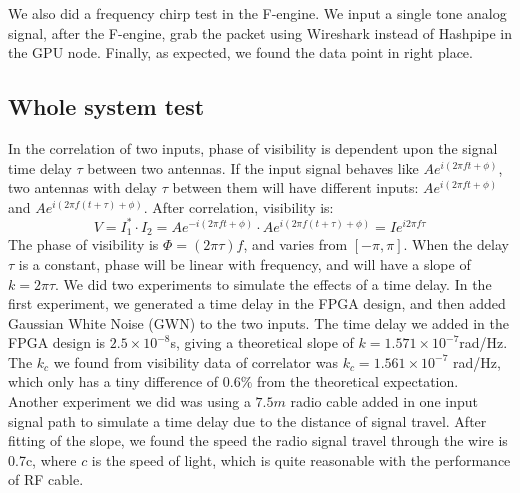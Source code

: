\documentclass{ws-jai}
\begin{document}
We also did a frequency chirp test in the F-engine. We input a single tone analog signal,  after the F-engine, grab the packet using  Wireshark instead of Hashpipe in the GPU node.
Finally, as expected, we found the data point in right place.


\subsection{Whole system test}
In the correlation of two inputs, phase of visibility is dependent upon the signal time delay $\tau$ between two antennas. If the input signal behaves like $Ae^{i(2\pi ft + \phi)}$, two antennas with delay $\tau$ between them will have different inputs: $Ae^{i(2\pi ft + \phi)}$ and  $Ae^{i(2\pi f(t+\tau) + \phi)}$.
After correlation, visibility is:
\begin{equation}
V = I_1^*\cdot I_2=Ae^{-i(2\pi ft + \phi)} \cdot Ae^{i(2\pi f(t+\tau) + \phi)} = I e^{i2\pi f\tau}
\end{equation}
The phase of visibility is $\Phi =(2\pi \tau )f$, and varies from $[-\pi, \pi]$.  When the delay $\tau$ is a constant, phase will be linear with frequency, and will have a slope of $k =2\pi \tau $. We did two experiments to simulate the effects of a time delay. In the first experiment, we generated a time delay in the FPGA design, and then added Gaussian White Noise (GWN) to the two inputs.  The time delay  we added in the FPGA design is  $2.5\times 10^{-8}$s, giving a theoretical slope of  $k=1.571\times 10^{-7}$rad/Hz. The $k_c$ we found from visibility data of correlator was $k_c = 1.561 \times 10^{-7}$ rad/Hz, which only has a tiny difference of $0.6\%$ from the theoretical expectation.
Another experiment we did was using a  $7.5m$ radio cable added in one input signal path to simulate a time delay due to the distance of signal travel. After fitting of the slope, we found the speed the radio signal travel through the wire is 0.7c, where $c$ is the speed of light, which is quite reasonable with the performance of RF cable.
\end{document}
